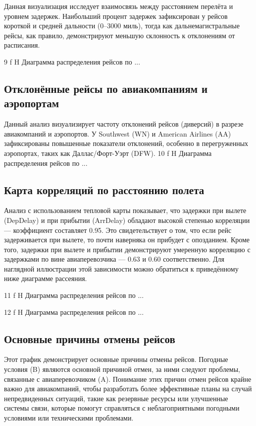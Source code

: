 Данная визуализация исследует взаимосвязь между расстоянием перелёта и уровнем задержек.
Наибольший процент задержек зафиксирован у рейсов короткой и средней дальности (0–3000 миль), тогда как дальнемагистральные рейсы, как правило, демонстрируют меньшую склонность к отклонениям от расписания.

{9}
{f}
{H}
{\textwidth}
{Диаграмма распределения рейсов по ...}


\subsection{Отклонённые рейсы по авиакомпаниям и аэропортам}

Данный анализ визуализирует частоту отклонений рейсов (диверсий) в разрезе авиакомпаний и аэропортов.
У Southwest (WN) и American Airlines (AA) зафиксированы повышенные показатели отклонений, особенно в перегруженных аэропортах, таких как Даллас/Форт-Уэрт (DFW).
{10}
{f}
{H}
{\textwidth}
{Диаграмма распределения рейсов по ...}

\subsection{Карта корреляций по расстоянию полета}

Анализ с использованием тепловой карты показывает, что задержки при вылете (DepDelay) и при прибытии (ArrDelay) обладают высокой степенью корреляции — коэффициент составляет 0.95.
Это свидетельствует о том, что если рейс задерживается при вылете, то почти наверняка он прибудет с опозданием.
Кроме того, задержки при вылете и прибытии демонстрируют умеренную корреляцию с задержками по вине авиаперевозчика — 0.63 и 0.60 соответственно.
Для наглядной иллюстрации этой зависимости можно обратиться к приведённому ниже диаграмме рассеяния.

{11}
{f}
{H}
{\textwidth}
{Диаграмма распределения рейсов по ...}

{12}
{f}
{H}
{\textwidth}
{Диаграмма распределения рейсов по ...}


\subsection{Основные причины отмены рейсов}

Этот график демонстрирует основные причины отмены рейсов.
Погодные условия (B) являются основной причиной отмен, за ними следуют проблемы, связанные с авиаперевозчиком (A). Понимание этих причин отмен рейсов крайне важно для авиакомпаний, чтобы разработать более эффективные планы на случай непредвиденных ситуаций, такие как резервные ресурсы или улучшенные системы связи, которые помогут справляться с неблагоприятными погодными условиями или техническими проблемами.

